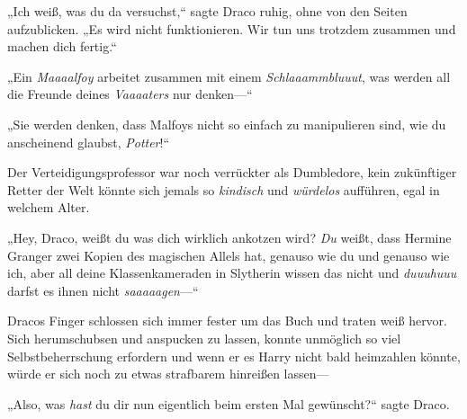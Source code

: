 „Ich weiß, was du da versuchst,“ sagte Draco ruhig, ohne von den Seiten aufzublicken. „Es wird nicht funktionieren. Wir tun uns trotzdem zusammen und machen dich fertig.“

„Ein \emph{Maaaalfoy} arbeitet zusammen mit einem \emph{Schlaaammbluuut}, was werden all die Freunde deines \emph{Vaaaaters} nur denken—“

„Sie werden denken, dass Malfoys nicht so einfach zu manipulieren sind, wie du anscheinend glaubst, \emph{Potter}!“

Der Verteidigungsprofessor war noch verrückter als Dumbledore, kein zukünftiger Retter der Welt könnte sich jemals so \emph{kindisch} und \emph{würdelos} aufführen, egal in welchem Alter.

„Hey, Draco, weißt du was dich wirklich ankotzen wird? \emph{Du} weißt, dass Hermine Granger zwei Kopien des magischen Allels hat, genauso wie du und genauso wie ich, aber all deine Klassenkameraden in Slytherin wissen das nicht und \emph{duuuhuuu} darfst es ihnen nicht \emph{saaaaagen}—“

Dracos Finger schlossen sich immer fester um das Buch und traten weiß hervor. Sich herumschubsen und anspucken zu lassen, konnte unmöglich so viel Selbstbeherrschung erfordern und wenn er es Harry nicht bald heimzahlen könnte, würde er sich noch zu etwas strafbarem hinreißen lassen—

„Also, was \emph{hast} du dir nun eigentlich beim ersten Mal gewünscht?“ sagte Draco.

